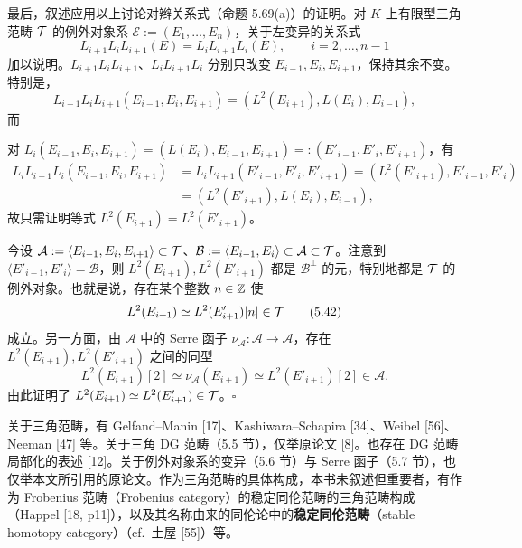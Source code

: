 最后，叙述应用以上讨论对辫关系式（命题 5.69(a)）的证明。对 $K$ 上有限型三角范畴 $\mathcal{T}$ 的例外对象系 $\mathcal{E} := (E_{1},\ldots,E_{n})$，关于左变异的关系式
\[
  L_{i+1}L_{i}L_{i+1}(E) = L_{i}L_{i+1}L_{i}(E), \qquad i = 2,\ldots,n-1
\]
加以说明。$L_{i+1}L_{i}L_{i+1}$、$L_{i}L_{i+1}L_{i}$ 分别只改变 $E_{i-1},E_{i},E_{i+1}$，保持其余不变。特别是，
\[
  L_{i+1}L_{i}L_{i+1}(E_{i-1},E_{i},E_{i+1}) = (L^{2}(E_{i+1}),L(E_{i}),E_{i-1}),
\]
而

对 $L_{i}(E_{i-1},E_{i},E_{i+1}) = (L(E_{i}),E_{i-1},E_{i+1}) =: (E'_{i-1},E'_{i},E'_{i+1})$，有
\[
\begin{aligned}
  L_{i}L_{i+1}L_{i}(E_{i-1},E_{i},E_{i+1})
  &= L_{i}L_{i+1}(E'_{i-1},E'_{i},E'_{i+1}) = (L^{2}(E'_{i+1}),E'_{i-1},E'_{i})\\
  &= (L^{2}(E'_{i+1}),L(E_{i}),E_{i-1}),
\end{aligned}
\]
故只需证明等式 $L^{2}(E_{i+1}) = L^{2}(E'_{i+1})$。

今设 $\mathcal{A} := \langle E_{i-1},E_{i},E_{i+1}\rangle \subset \mathcal{T}$、$\mathcal{B} := \langle E_{i-1},E_{i}\rangle \subset \mathcal{A} \subset \mathcal{T}$。注意到 $\langle E'_{i-1},E'_{i}\rangle = \mathcal{B}$，则 $L^{2}(E_{i+1}), L^{2}(E'_{i+1})$ 都是 $\mathcal{B}^{\perp}$ 的元，特别地都是 $\mathcal{T}$ 的例外对象。也就是说，存在某个整数 $n \in \mathbb{Z}$ 使
\begin{equation}
  L^{2}(E_{i+1}) \simeq L^{2}(E'_{i+1})[n] \in \mathcal{T} \tag{5.42}
\end{equation}
成立。另一方面，由 $\mathcal{A}$ 中的 Serre 函子 $\nu_{\mathcal{A}} \colon \mathcal{A} \to \mathcal{A}$，存在 $L^{2}(E_{i+1}), L^{2}(E'_{i+1})$ 之间的同型
\[
  L^{2}(E_{i+1})[2] \simeq \nu_{\mathcal{A}}(E_{i+1}) \simeq L^{2}(E'_{i+1})[2] \in \mathcal{A}.
\]
由此证明了 $L^{2}(E_{i+1}) \simeq L^{2}(E'_{i+1}) \in \mathcal{T}$。\hfill$\square$


 关于三角范畴，有 Gelfand–Manin [17]、Kashiwara–Schapira [34]、Weibel [56]、Neeman [47] 等。关于三角 DG 范畴（5.5 节），仅举原论文 [8]。也存在 DG 范畴局部化的表述 [12]。关于例外对象系的变异（5.6 节）与 Serre 函子（5.7 节），也仅举本文所引用的原论文。作为三角范畴的具体构成，本书未叙述但重要者，有作为 Frobenius 范畴（Frobenius category）的稳定同伦范畴的三角范畴构成（Happel [18, p11]），以及其名称由来的同伦论中的\textbf{稳定同伦范畴}（stable homotopy category）（cf.\ 土屋 [55]）等。
